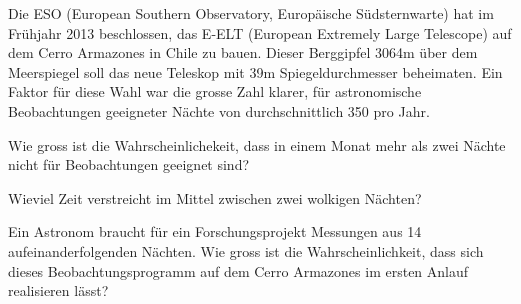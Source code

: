 Die ESO (European Southern Observatory, Europäische Südsternwarte)
hat im Frühjahr 2013 beschlossen,
das E-ELT (European Extremely Large Telescope) auf dem
Cerro Armazones in Chile zu bauen.
Dieser Berggipfel 3064m über dem Meerspiegel soll das neue Teleskop
mit 39m Spiegeldurchmesser beheimaten.
Ein Faktor für diese Wahl war die grosse Zahl klarer, für astronomische
Beobachtungen geeigneter Nächte von durchschnittlich 350 pro Jahr.
\begin{teilaufgaben}
\item Wie gross ist die Wahrscheinlichekeit,
dass in einem Monat mehr als zwei Nächte
nicht für Beobachtungen geeignet sind?
\item Wieviel Zeit verstreicht im Mittel zwischen zwei wolkigen Nächten?
\item Ein Astronom braucht für ein Forschungsprojekt Messungen aus
14 aufeinanderfolgenden Nächten. Wie gross ist die Wahrscheinlichkeit,
dass sich dieses Beobachtungsprogramm auf dem Cerro Armazones
im ersten Anlauf realisieren lässt?
\end{teilaufgaben}

